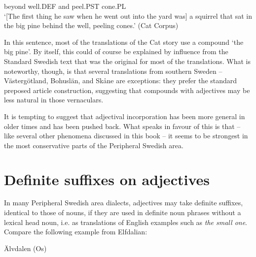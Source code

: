 beyond  well.DEF  and  peel.PST  cone.PL\\

\glt ‘[The first thing he saw when he went out into the yard was] a squirrel that sat in the big pine behind the well, peeling cones.’ (Cat Corpus)

\z

In this sentence, most of the translations of the Cat story use a compound  ‘the big pine’. By itself, this could of course be explained by influence from the Standard Swedish text that was the original for most of the translations. What is noteworthy, though, is that several translations from southern Sweden – Västergötland, Bohuslän, and Skåne are exceptions: they prefer the standard preposed article construction, suggesting that compounds with adjectives may be less natural in those vernaculars.


It is tempting to suggest that adjectival incorporation has been more general in older times and has been pushed back. What speaks in favour of this is that – like several other phenomena discussed in this book – it seems to be strongest in the most conservative parts of the Peripheral Swedish area. 


\section{\rmfamily Definite suffixes on adjectives}
\label{bkm:Ref155519944}
In many Peripheral Swedish area dialects, adjectives may take definite suffixes, identical to those of nouns, if they are used in definite noun phrases without a lexical head noun, i.e. as translations of English examples such as \textit{the small one}. Compare the following example from Elfdalian:


\item 

\label{bkm:Ref78439135}Älvdalen (Os)

